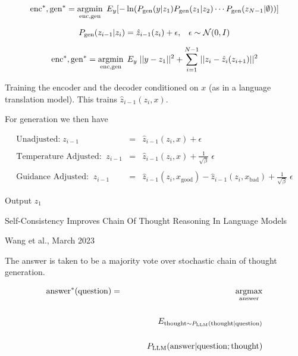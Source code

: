 {

{\huge
$$\mathrm{enc}^*,\mathrm{gen}^* = \operatorname*{argmin}_{\mathrm{enc},\mathrm{gen}} \;E_y[- \ln (P_{\mathrm{gen}}(y|z_1)P_{\mathrm{gen}}(z_1|z_2)\cdots P_{\mathrm{gen}}(z_{N-1}|\emptyset))]$$
}

$$P_{\mathrm{gen}}(z_{i-1}|z_i) = \hat{z}_{i-1}(z_i) + \epsilon,\;\;\;\epsilon\sim {\cal N}(0,I)$$

$$\mathrm{enc}^*,\mathrm{gen}^* = \operatorname*{argmin}_{\mathrm{enc},\mathrm{gen}} \;E_y\;||y - z_1||^2 + \sum_{i=1}^{N-1} ||z_i - \hat{z}_i(z_{i+1})||^2$$


Training the encoder and the decoder conditioned on $x$ (as in a language translation model).
This trains $\hat{z}_{i-1}(z_i,x)$.

\vfill
For generation we then have

{\huge
\begin{eqnarray*}
\mbox{Unadjusted:} \;z_{i-1} & = & \hat{z}_{i-1}(z_i,x) + \epsilon \\
\\
\mbox{Temperature Adjusted:}\;\;z_{i-1} & = & \hat{z}_{i-1}(z_i,x) + \frac{1}{\sqrt{\beta}}\;\epsilon \\
\\
\mbox{Guidance Adjusted:} \;\;z_{i-1} & = & \hat{z}_{i-1}(z_i,x_\mathrm{good}) - \hat{z}_{i-1}(z_i,x_\mathrm{bad}) + \frac{1}{\sqrt{\beta}}\;\epsilon
\end{eqnarray*}
}

\vfill
Output $z_1$

\newcommand{\answer}{\mathrm{answer}}
\newcommand{\thought}{\mathrm{thought}}
\newcommand{\question}{\mathrm{question}}
\newcommand{\LLM}{\mathrm{LLM}}

{\huge
\centerline{Self-Consistency Improves Chain Of Thought Reasoning In Language Models}
\centerline{Wang et al., March 2023}
}
\vfill
The answer is taken to be a majority vote over stochastic chain of thought generation.

\begin{eqnarray*}
\answer^*(\question) 
& = & \argmax_{\answer}\\
\\
& & \;\;\;\;E_{\thought \sim P_{\LLM}({\thought|\question})} \\
\\
& & \;\;\;\;\;\;\;\;P_\LLM(\answer|\question;\thought)
\end{eqnarray*}


}


